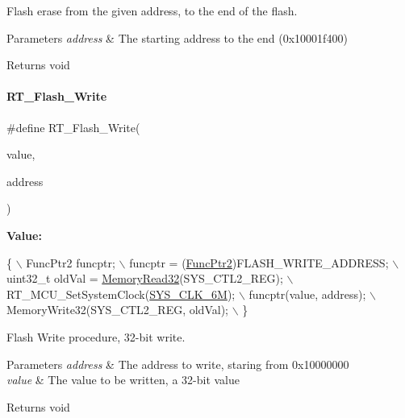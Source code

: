 Flash erase from the given address, to the end of the flash. 


\begin{DoxyParams}{Parameters}
{\em address} & The starting address to the end (0x10001f400) \\
\hline
\end{DoxyParams}
\begin{DoxyReturn}{Returns}
void 
\end{DoxyReturn}
\mbox{\label{a00008_a13fb43316f72b3b1b9467a91fca08d5c}} 
\paragraph{\texorpdfstring{R\+T\+\_\+\+Flash\+\_\+\+Write}{RT\_Flash\_Write}}
{\footnotesize\ttfamily \#define R\+T\+\_\+\+Flash\+\_\+\+Write(\begin{DoxyParamCaption}\item[{}]{value,  }\item[{}]{address }\end{DoxyParamCaption})}

{\bfseries Value\+:}
\begin{DoxyCode}
\{                                                   \(\backslash\)
        FuncPtr2 funcptr;                               \(\backslash\)
        funcptr = (\mbox{\hyperlink{a00020_a331a88eeefe11112bb8fe1b43dd777b8}{FuncPtr2}})FLASH\_WRITE\_ADDRESS;        \(\backslash\)
        uint32\_t oldVal = \mbox{\hyperlink{a00020_a2d484dc15bdf30ee11ab3b05f31f0e16}{MemoryRead32}}(SYS\_CTL2\_REG);   \(\backslash\)
        RT\_MCU\_SetSystemClock(\mbox{\hyperlink{a00020_ae3a2d501b8662e11b969fb4a5e195e5bad1640aa8c46162a7551abca12293ef39}{SYS\_CLK\_6M}});              \(\backslash\)
        funcptr(value, address);                        \(\backslash\)
        MemoryWrite32(SYS\_CTL2\_REG, oldVal);            \(\backslash\)
    \}
\end{DoxyCode}


Flash Write procedure, 32-\/bit write. 


\begin{DoxyParams}{Parameters}
{\em address} & The address to write, staring from 0x10000000 \\
\hline
{\em value} & The value to be written, a 32-\/bit value \\
\hline
\end{DoxyParams}
\begin{DoxyReturn}{Returns}
void 
\end{DoxyReturn}
